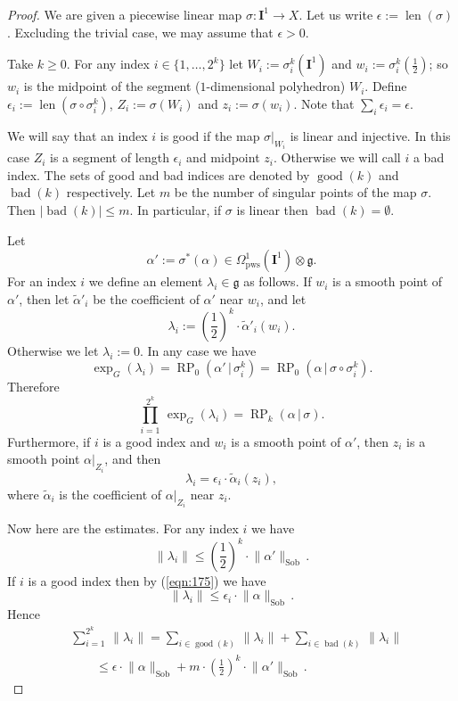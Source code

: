 \documentclass[10pt, a4paper]{amsart}
\theoremstyle{definition}
\numberwithin{equation}{section}
\newcommand{\opn}{\operatorname}
\newcommand{\mfrak}[1]{\mathfrak{#1}}
\newcommand{\mbf}[1]{\mathbf{#1}}
\newcommand{\mrm}[1]{\mathrm{#1}}
\newcommand{\smfrac}[2]{{\textstyle \frac{#1}{#2}}}
\newcommand{\til}[1]{\tilde{#1}}
\newcommand{\norm}[1]{\lVert #1 \rVert}
\newcommand{\abs}[1]{\lvert #1 \rvert}
\renewcommand{\vert}{\, | \,}
\newcommand{\g}{\mfrak{g}}
\begin{document}
\begin{proof}
We are given a piecewise linear map $\sigma : \mbf{I}^1 \to X$.
Let us write $\epsilon := \opn{len}(\sigma)$.
Excluding the trivial case, we may assume that $\epsilon > 0$.

Take $k \geq 0$. For any index
$i \in \{ 1, \ldots, 2^k \}$ let
$W_i := \sigma^k_i(\mbf{I}^1)$ and 
$w_i := \sigma^k_i(\smfrac{1}{2})$; so
$w_i$ is the midpoint of the segment ($1$-dimensional polyhedron) $W_i$. 
Define
$\epsilon_i := \opn{len}(\sigma \circ \sigma^k_i)$,
$Z_i := \sigma(W_i)$ and $z_i := \sigma(w_i)$. 
Note that 
$\sum_{i} \epsilon_i = \epsilon$.

We will say that an index $i$ is good if the map
$\sigma|_{W_i}$ is linear and injective. 
In this case $Z_i$ is a segment of length $\epsilon_i$ and midpoint $z_i$. 
Otherwise we will call $i$ a bad index.
The sets of good and bad indices are denoted by $\opn{good}(k)$ and 
$\opn{bad}(k)$ respectively. Let $m$ be the number of singular points of the map
$\sigma$. Then $\abs{ \opn{bad}(k) } \leq m$. In particular, if $\sigma$ is
linear then $\opn{bad}(k) = \emptyset$.

Let
\[ \alpha' := \sigma^*(\alpha) \in \Omega^1_{\mrm{pws}}(\mbf{I}^1) \otimes \g .
\]
For an index $i$ we define an element
$\lambda_i \in \g$ as follows. If $w_i$ is a smooth point of $\alpha'$, then let
$\til{\alpha}'_i$ be the coefficient of $\alpha'$ near $w_i$, and let
\[ \lambda_i := (\smfrac{1}{2})^k \cdot \til{\alpha}'_i(w_i) . \]
Otherwise we let 
$\lambda_i := 0$.
In any case we have
\[ \exp_G(\lambda_i) = \opn{RP}_{0}(\alpha' \vert \sigma^k_i) = 
\opn{RP}_{0}(\alpha \vert \sigma \circ \sigma^k_i) . \]
Therefore
\begin{equation} \label{eqn:174}
\prod_{i = 1}^{2^k} \, \exp_G(\lambda_i) = 
\opn{RP}_{k}(\alpha \vert \sigma) .
\end{equation}
Furthermore, if $i$ is a good index and $w_i$ is a smooth point of $\alpha'$,
then $z_i$ is a smooth point $\alpha|_{Z_i}$, and then 
\begin{equation} \label{eqn:175}
\lambda_i = \epsilon_i \cdot \til{\alpha}_i(z_i) , 
\end{equation}
where $\til{\alpha}_i$ is the coefficient of $\alpha|_{Z_i}$ near $z_i$. 

Now here are the estimates. For any index $i$  we have 
\[ \norm{ \lambda_i } \leq (\smfrac{1}{2})^k \cdot \norm{ \alpha' }_{\mrm{Sob}}
\, . \]
If $i$ is a good index then by (\ref{eqn:175}) we have
\[ \norm{ \lambda_i } \leq \epsilon_i \cdot \norm{ \alpha }_{\mrm{Sob}} \, . \]
Hence
\begin{equation} \label{eqn:176}
\begin{aligned}
& \sum_{i = 1}^{2^k} \, \norm{ \lambda_i } = 
\sum_{i \in \opn{good}(k)} \, \norm{ \lambda_i } + 
\sum_{i \in \opn{bad}(k)} \, \norm{ \lambda_i } \\
& \qquad \leq 
\epsilon \cdot \norm{ \alpha }_{\mrm{Sob}} +
m \cdot (\smfrac{1}{2})^k \cdot \norm{ \alpha' }_{\mrm{Sob}} \, . 
\end{aligned}
\end{equation}


\end{proof}
\end{document}
